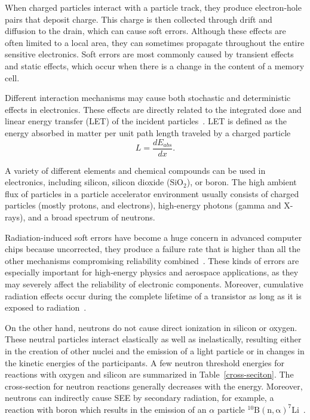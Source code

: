 When charged particles interact with a particle track, they produce electron-hole pairs that deposit charge. This charge is then collected through drift and diffusion to the drain, which can cause soft errors. Although these effects are often limited to a local area, they can sometimes propagate throughout the entire sensitive electronics. Soft errors are most commonly caused by transient effects and static effects, which occur when there is a change in the content of a memory cell.

Different interaction mechanisms may cause both stochastic and deterministic effects in electronics. These effects are directly related to the integrated dose and linear energy transfer (\gls{LET}) of the incident particles~\cite{electronic_system_on_module}.  LET is defined as the energy absorbed in matter per unit path length traveled by a charged particle
\begin{equation}
    L = \frac{dE_{abs}}{dx}.
\end{equation}

A variety of different elements and chemical compounds can be used in electronics, including silicon, silicon dioxide ($\mathrm{SiO}_{2}$), or boron. The high ambient flux of particles in a particle accelerator environment usually consists of charged particles (mostly protons, and electrons), high-energy photons (gamma and X-rays), and a broad spectrum of neutrons.

 Radiation-induced soft errors have become a huge concern in advanced computer chips because uncorrected, they produce a failure rate that is higher than all the other mechanisms compromising reliability combined~\cite{1545891}. These kinds of errors are especially important for high-energy physics and aerospace applications, as they may severely affect the reliability of electronic components. Moreover, cumulative radiation effects occur during the complete lifetime of a transistor as long as it is exposed to radiation~\cite{RodriguezRodriguez2020}.


On the other hand, neutrons do not cause direct ionization in silicon or oxygen. These neutral particles interact elastically as well as inelastically, resulting either in the creation of other nuclei and the emission of a light particle or in changes in the kinetic energies of the participants. A few neutron threshold energies for reactions with oxygen and silicon are summarized in Table~\ref{cross-seciton}. The cross-section for neutron reactions generally decreases with the energy. Moreover, neutrons can indirectly cause \gls{SEE} by secondary radiation, for example, a reaction with boron which results in the emission of an $\alpha$ particle $\mathrm{^{10}B(n,\alpha)^{7}Li}$~\cite{1545891,neutrons_energy,neutrons_energy_2}. 


